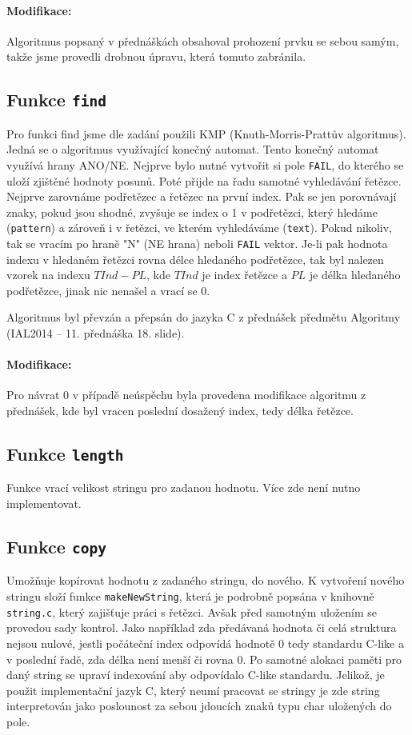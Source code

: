 \documentclass[12pt,a4paper,titlepage,final]{article}
\begin{document}
\paragraph{Modifikace:} Algoritmus popsaný v přednáškách obsahoval prohození
prvku se sebou samým, takže jsme provedli drobnou úpravu, která tomuto zabránila.

\subsection{Funkce \texttt{find}}
Pro funkci find jsme dle zadání použili KMP (Knuth-Morris-Prattův algoritmus).
Jedná se o algoritmus využívající konečný automat. Tento konečný automat využívá
hrany ANO/NE. Nejprve bylo nutné vytvořit si pole \verb|FAIL|, do kterého se
uloží zjištěné hodnoty posunů. Poté přijde na řadu samotné vyhledávání řetězce.
Nejprve zarovnáme podřetězec a řetězec na první index. Pak se jen porovnávají znaky,
pokud jsou shodné, zvyšuje se index o 1 v podřetězci, který hledáme (\verb|pattern|)
a zároveň i v řetězci, ve kterém vyhledáváme (\verb|text|). Pokud nikoliv, tak se
vracím po hraně "N" (NE hrana) neboli \verb|FAIL| vektor. Je-li pak hodnota indexu
v hledaném řetězci rovna délce hledaného podřetězce, tak byl nalezen vzorek na
indexu $TInd - PL$, kde $TInd$ je index řetězce a $PL$ je délka hledaného podřetězce,
jinak nic nenašel a vrací se 0.

Algoritmus byl převzán a přepsán do jazyka C z přednášek předmětu Algoritmy (IAL2014
\cite{honzik2} -- 11. přednáška 18. slide).
 
\paragraph{Modifikace:} Pro návrat 0 v případě neúspěchu byla provedena modifikace
algoritmu z přednášek, kde byl vracen poslední dosažený index, tedy délka řetězce.

\subsection{Funkce \texttt{length}}
Funkce vrací velikost stringu pro zadanou hodnotu. Více zde není nutno implementovat.

\subsection{Funkce \texttt{copy}}
Umožňuje kopírovat hodnotu z zadaného stringu, do nového. K vytvoření nového stringu složí funkce \verb|makeNewString|, která je podrobně popsána v knihovně \verb|string.c|, který zajišťuje práci s řetězci. Avšak před samotným uložením se provedou sady kontrol. Jako například zda předávaná hodnota či celá struktura nejsou nulové, jestli počáteční index odpovídá hodnotě 0 tedy standardu C-like a v poslední řadě, zda délka není menší či rovna 0. Po samotné alokaci paměti pro daný string se upraví indexování aby odpovídalo C-like standardu. Jelikož, je použit implementační jazyk C, který neumí pracovat se stringy je zde string interpretován jako poslounost za sebou jdoucích znaků typu char uložených do pole.
\end{document}
